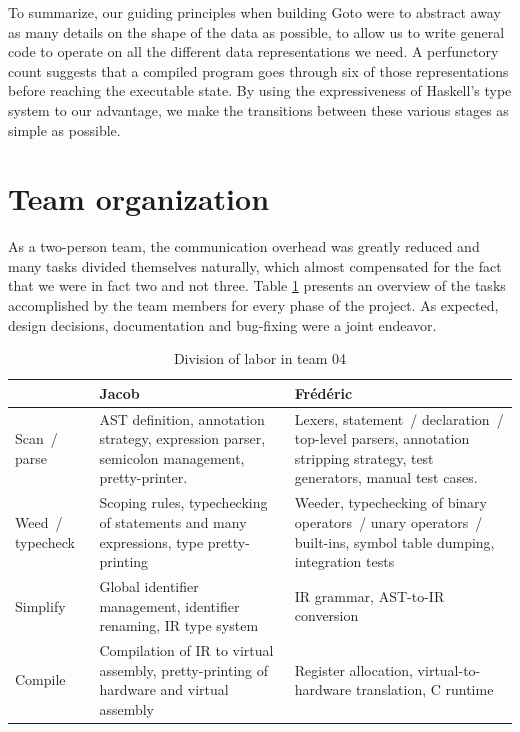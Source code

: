 \documentclass[letterpaper,11pt]{article}
\begin{document}
To summarize, our guiding principles when building Goto were to abstract away as many details on the shape of the data as possible, to allow us to write general code to operate on all the different data representations we need. A perfunctory count suggests that a compiled program goes through six of those representations before reaching the executable state. By using the expressiveness of Haskell's type system to our advantage, we make the transitions between these various stages as simple as possible.

\section{Team organization}
\label{sec:org}

As a two-person team, the communication overhead was greatly reduced and many tasks divided themselves naturally, which almost compensated for the fact that we were in fact two and not three. Table \ref{tab:dol} presents an overview of the tasks accomplished by the team members for every phase of the project. As expected, design decisions, documentation and bug-fixing were a joint endeavor.

\begin{table}
	\begin{tabular}{|l|p{15em}|p{15em}|}
	\hline
	& \textbf{Jacob} & \textbf{Fr\'ed\'eric} \\
	\hline
	Scan~/ parse & AST definition, annotation strategy, expression parser, semicolon management, pretty-printer. & Lexers, statement~/ declaration~/ top-level parsers, annotation stripping strategy, test generators, manual test cases. \\
	\hline
	Weed~/ typecheck & Scoping rules, typechecking of statements and many expressions, type pretty-printing & Weeder, typechecking of binary operators~/ unary operators~/ built-ins, symbol table dumping, integration tests \\
	\hline
	Simplify & Global identifier management, identifier renaming, IR type system & IR grammar, AST-to-IR conversion \\
	\hline
	Compile & Compilation of IR to virtual assembly, pretty-printing of hardware and virtual assembly & Register allocation, virtual-to-hardware translation, C runtime \\
	\hline 
	\end{tabular}
	\caption{Division of labor in team 04}
	\label{tab:dol}
\end{table}
\end{document}
